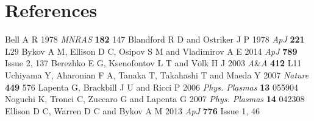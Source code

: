 \section*{References}
\begin{thebibliography}{20}
 Bell A R 1978 \textit{MNRAS} \textbf{182} 147
 Blandford R D and Ostriker J P 1978 \textit{ApJ} \textbf{221} L29 
 Bykov A M, Ellison D C, Osipov S M and Vladimirov A E 2014 \textit{ApJ} \textbf{789} Issue 2, 137
 Berezhko E G, Ksenofontov L T and V{\"o}lk H J  2003 \textit{A}{\&}\textit{A} \textbf{412} L11
 Uchiyama Y, Aharonian F A, Tanaka T, Takahashi T and Maeda Y 2007 \textit{Nature} \textbf{449} 576
 Lapenta G, Brackbill J U and Ricci P 2006 \textit{Phys. Plasmas} \textbf{13} 055904
 Noguchi K, Tronci C, Zuccaro G and Lapenta G 2007 \textit{Phys. Plasmas} \textbf{14} 042308
 Ellison D C, Warren D C and Bykov A M 2013 \textit{ApJ} \textbf{776} Issue 1, 46
\end{thebibliography}